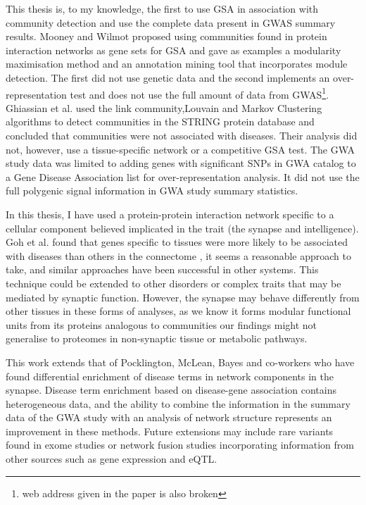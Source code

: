 This thesis is, to my knowledge, the first to use GSA in association with community detection and use the complete data present in GWAS summary results. Mooney and Wilmot proposed using communities found in protein interaction networks as gene sets for GSA\cite{mooney2015gene} and gave as examples a modularity maximisation method and an annotation mining tool that incorporates module detection. The first did not use genetic data \cite{xu2010module} and the second implements an over-representation test and does not use the full amount of data from GWAS\footnote{web address given in the paper is also broken}\cite{cowley2012pina}. Ghiassian et al.\cite{ghiassian2015disease} used the link community\cite{ahn2010link},Louvain\cite{blondel2008fast} and Markov Clustering\cite{dongen2000graph} algorithms to detect communities in the STRING protein database and concluded that communities were not associated with diseases. Their analysis did not, however, use a tissue-specific network or a competitive GSA test. The GWA study data was limited to adding genes with significant SNPs in GWA catalog\cite{ghiassian2015disease} to a Gene Disease Association list for over-representation analysis. It did not use the full polygenic signal information in GWA study summary statistics.  

In this thesis, I have used a protein-protein interaction network specific to a cellular component believed implicated in the trait (the synapse and intelligence\cite{hill2014functional}). Goh et al. found that genes specific to tissues were more likely to be associated with diseases than others in the connectome \cite{goh2007human}, it seems a reasonable approach to take, and similar approaches have been successful in other systems\cite{lundby2014annotation}. This technique could be extended to other disorders or complex traits that may be mediated by synaptic function. However, the synapse may behave differently from other tissues in these forms of analyses, as we know it forms modular functional units from its proteins analogous to communities\cite{grant2012synaptopathies} our findings might not generalise to proteomes in non-synaptic tissue or metabolic pathways.

This work extends that of Pocklington\cite{pocklington2006organization}, McLean\cite{mclean2016improved}, Bayes\cite{bayes2011characterization} and co-workers who have found differential enrichment of disease terms in network components in the synapse. Disease term enrichment based on disease-gene association contains heterogeneous data, and the ability to combine the information in the summary data of the GWA study with an analysis of network structure represents an improvement in these methods. Future extensions may include rare variants found in exome studies or network fusion studies incorporating information from other sources such as gene expression and eQTL. 
 
